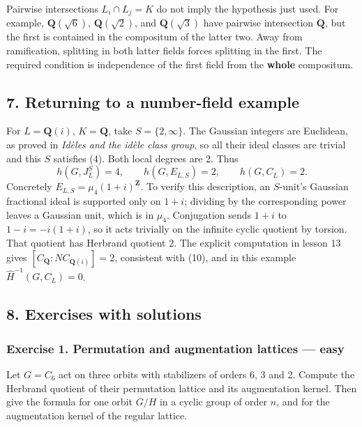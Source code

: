 \documentclass[11pt,a4paper]{article}
\begin{document}
Pairwise intersections \(L_i\cap L_j=K\) do not imply the hypothesis
just used. For example, \(\mathbf Q(\sqrt6)\), \(\mathbf Q(\sqrt2)\),
and \(\mathbf Q(\sqrt3)\) have pairwise intersection \(\mathbf Q\), but
the first is contained in the compositum of the latter two. Away from
ramification, splitting in both latter fields forces splitting in the
first. The required condition is independence of the first field from
the \textbf{whole} compositum.

\subsection{7. Returning to a number-field
example}\label{returning-to-a-number-field-example}

For \(L=\mathbf Q(i)\), \(K=\mathbf Q\), take \(S=\{2,\infty\}\). The
Gaussian integers are Euclidean, as proved in \emph{Idèles and the idèle
class group}, so all their ideal classes are trivial and this \(S\)
satisfies (4). Both local degrees are 2. Thus \[
h(G,J_L^S)=4,\qquad h(G,E_{L,S})=2,\qquad h(G,C_L)=2.
\tag{11}
\] Concretely \(E_{L,S}=\mu_4(1+i)^{\mathbf Z}\). To verify this
description, an \(S\)-unit's Gaussian fractional ideal is supported only
on \(1+i\); dividing by the corresponding power leaves a Gaussian unit,
which is in \(\mu_4\). Conjugation sends \(1+i\) to \(1-i=-i(1+i)\), so
it acts trivially on the infinite cyclic quotient by torsion. That
quotient has Herbrand quotient 2. The explicit computation in lesson 13
gives \([C_{\mathbf Q}:N C_{\mathbf Q(i)}]=2\), consistent with (10),
and in this example \(\widehat H^{-1}(G,C_L)=0\).

\subsection{8. Exercises with solutions}\label{exercises-with-solutions}

\subsubsection{Exercise 1. Permutation and augmentation lattices ---
easy}\label{exercise-1.-permutation-and-augmentation-lattices-easy}

Let \(G=C_6\) act on three orbits with stabilizers of orders 6, 3 and 2.
Compute the Herbrand quotient of their permutation lattice and its
augmentation kernel. Then give the formula for one orbit \(G/H\) in a
cyclic group of order \(n\), and for the augmentation kernel of the
regular lattice.
\end{document}
